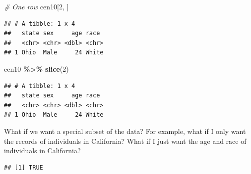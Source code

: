 \documentclass[]{book}
\newenvironment{Shaded}{\begin{snugshade}}{\end{snugshade}}
\newcommand{\CommentTok}[1]{\textcolor[rgb]{0.56,0.35,0.01}{\textit{#1}}}
\newcommand{\DecValTok}[1]{\textcolor[rgb]{0.00,0.00,0.81}{#1}}
\newcommand{\KeywordTok}[1]{\textcolor[rgb]{0.13,0.29,0.53}{\textbf{#1}}}
\newcommand{\NormalTok}[1]{#1}
\newcommand{\OperatorTok}[1]{\textcolor[rgb]{0.81,0.36,0.00}{\textbf{#1}}}
\newcommand{\StringTok}[1]{\textcolor[rgb]{0.31,0.60,0.02}{#1}}
\theoremstyle{definition}
\theoremstyle{definition}
\theoremstyle{definition}
\theoremstyle{remark}
\begin{document}
\begin{Shaded}
\begin{Highlighting}[]
\begin{Shaded}
\begin{Highlighting}[]
\begin{Shaded}
\begin{Highlighting}[]
\CommentTok{\# One row}
\NormalTok{cen10[}\DecValTok{2}\NormalTok{, ]}
\end{Highlighting}
\end{Shaded}

\begin{verbatim}
## # A tibble: 1 x 4
##   state sex     age race 
##   <chr> <chr> <dbl> <chr>
## 1 Ohio  Male     24 White
\end{verbatim}

\begin{Shaded}
\begin{Highlighting}[]
\NormalTok{cen10 }\OperatorTok{\%>\%}\StringTok{ }\KeywordTok{slice}\NormalTok{(}\DecValTok{2}\NormalTok{)}
\end{Highlighting}
\end{Shaded}

\begin{verbatim}
## # A tibble: 1 x 4
##   state sex     age race 
##   <chr> <chr> <dbl> <chr>
## 1 Ohio  Male     24 White
\end{verbatim}

What if we want a special subset of the data? For example, what if I only want the records of individuals in California? What if I just want the age and race of individuals in California?

\begin{Shaded}
\end{Shaded}

\begin{verbatim}
## [1] TRUE
\end{verbatim}

\begin{Shaded}
\end{Shaded}
\end{Highlighting}
\end{Shaded}
\end{Highlighting}
\end{Shaded}
\end{document}
